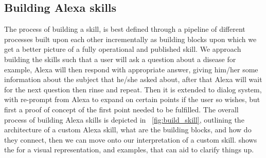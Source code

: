 \documentclass[10pt,journal,compsoc]{IEEEtran}
\begin{document}
\subsection{Building Alexa skills} 
\noindent The process of building a skill, is best defined through a pipeline of different processes built upon each other incrementally as building blocks upon which we get a better picture of a fully operational and published skill. We approach building the skills such that a user will ask a question about a disease for example, Alexa will then respond with appropriate answer, giving him/her some information about the subject that he/she asked about, after that Alexa will wait for the next question then rinse and repeat. Then it is extended to dialog system, with re-prompt from Alexa to expand on certain points if the user so wishes, but first a proof of concept of the first point needed to be fulfilled. The overall process of building Alexa skills is depicted in ~\cref{fig:build_skill}, outlining the architecture of a custom Alexa skill, what are the building blocks, and how do they connect, then we can move onto our interpretation of a custom skill.  shows the for a visual representation, and examples, that can aid to clarify things up. 


\end{document}

